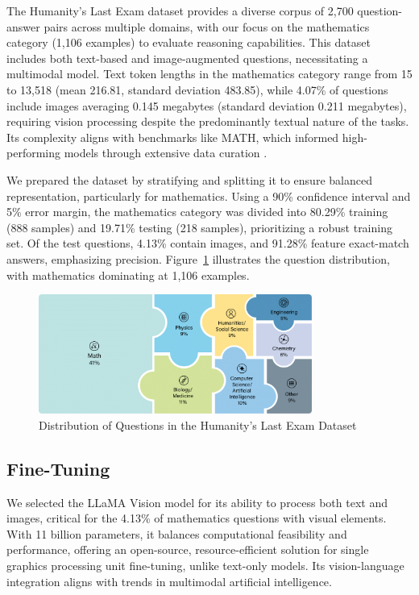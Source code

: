 \documentclass{svproc}
\begin{document}
The Humanity's Last Exam dataset provides a diverse corpus of 2,700 question-answer pairs across multiple domains, with our focus on the mathematics category (1,106 examples) to evaluate reasoning capabilities. This dataset includes both text-based and image-augmented questions, necessitating a multimodal model. Text token lengths in the mathematics category range from 15 to 13,518 (mean 216.81, standard deviation 483.85), while 4.07\% of questions include images averaging 0.145 megabytes (standard deviation 0.211 megabytes), requiring vision processing despite the predominantly textual nature of the tasks. Its complexity aligns with benchmarks like MATH, which informed high-performing models through extensive data curation \cite{hendrycksmath2021,shao2024deepseekmathpushinglimitsmathematical}.

We prepared the dataset by stratifying and splitting it to ensure balanced representation, particularly for mathematics. Using a 90\% confidence interval and 5\% error margin, the mathematics category was divided into 80.29\% training (888 samples) and 19.71\% testing (218 samples), prioritizing a robust training set. Of the test questions, 4.13\% contain images, and 91.28\% feature exact-match answers, emphasizing precision. Figure~\ref{fig:dataset} illustrates the question distribution, with mathematics dominating at 1,106 examples.

\begin{figure}[h]
  \centering
  \includegraphics[width=0.8\textwidth]{.assets/dataset.png}
  \caption{Distribution of Questions in the Humanity's Last Exam Dataset \cite{phan2025humanitysexam}}
  \label{fig:dataset}
\end{figure}

\subsection{Fine-Tuning}

We selected the LLaMA Vision model for its ability to process both text and images, critical for the 4.13\% of mathematics questions with visual elements. With 11 billion parameters, it balances computational feasibility and performance, offering an open-source, resource-efficient solution for single graphics processing unit fine-tuning, unlike text-only models. Its vision-language integration aligns with trends in multimodal artificial intelligence.
\end{document}
